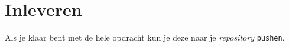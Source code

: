 \newpage
\section{Inleveren}
Als je klaar bent met de hele opdracht kun je deze naar je \textit{repository} \texttt{pushen}.




